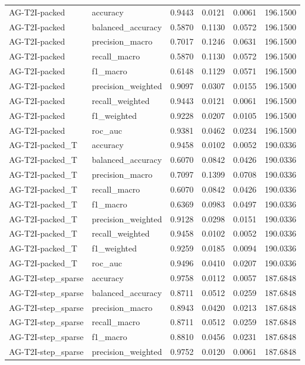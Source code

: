 \begin{tabular}{llrrrr}
AG-T2I-packed & accuracy & 0.9443 & 0.0121 & 0.0061 & 196.1500 \\
AG-T2I-packed & balanced_accuracy & 0.5870 & 0.1130 & 0.0572 & 196.1500 \\
AG-T2I-packed & precision_macro & 0.7017 & 0.1246 & 0.0631 & 196.1500 \\
AG-T2I-packed & recall_macro & 0.5870 & 0.1130 & 0.0572 & 196.1500 \\
AG-T2I-packed & f1_macro & 0.6148 & 0.1129 & 0.0571 & 196.1500 \\
AG-T2I-packed & precision_weighted & 0.9097 & 0.0307 & 0.0155 & 196.1500 \\
AG-T2I-packed & recall_weighted & 0.9443 & 0.0121 & 0.0061 & 196.1500 \\
AG-T2I-packed & f1_weighted & 0.9228 & 0.0207 & 0.0105 & 196.1500 \\
AG-T2I-packed & roc_auc & 0.9381 & 0.0462 & 0.0234 & 196.1500 \\
AG-T2I-packed_T & accuracy & 0.9458 & 0.0102 & 0.0052 & 190.0336 \\
AG-T2I-packed_T & balanced_accuracy & 0.6070 & 0.0842 & 0.0426 & 190.0336 \\
AG-T2I-packed_T & precision_macro & 0.7097 & 0.1399 & 0.0708 & 190.0336 \\
AG-T2I-packed_T & recall_macro & 0.6070 & 0.0842 & 0.0426 & 190.0336 \\
AG-T2I-packed_T & f1_macro & 0.6369 & 0.0983 & 0.0497 & 190.0336 \\
AG-T2I-packed_T & precision_weighted & 0.9128 & 0.0298 & 0.0151 & 190.0336 \\
AG-T2I-packed_T & recall_weighted & 0.9458 & 0.0102 & 0.0052 & 190.0336 \\
AG-T2I-packed_T & f1_weighted & 0.9259 & 0.0185 & 0.0094 & 190.0336 \\
AG-T2I-packed_T & roc_auc & 0.9496 & 0.0410 & 0.0207 & 190.0336 \\
AG-T2I-step_sparse & accuracy & 0.9758 & 0.0112 & 0.0057 & 187.6848 \\
AG-T2I-step_sparse & balanced_accuracy & 0.8711 & 0.0512 & 0.0259 & 187.6848 \\
AG-T2I-step_sparse & precision_macro & 0.8943 & 0.0420 & 0.0213 & 187.6848 \\
AG-T2I-step_sparse & recall_macro & 0.8711 & 0.0512 & 0.0259 & 187.6848 \\
AG-T2I-step_sparse & f1_macro & 0.8810 & 0.0456 & 0.0231 & 187.6848 \\
AG-T2I-step_sparse & precision_weighted & 0.9752 & 0.0120 & 0.0061 & 187.6848 \\

\end{tabular}
